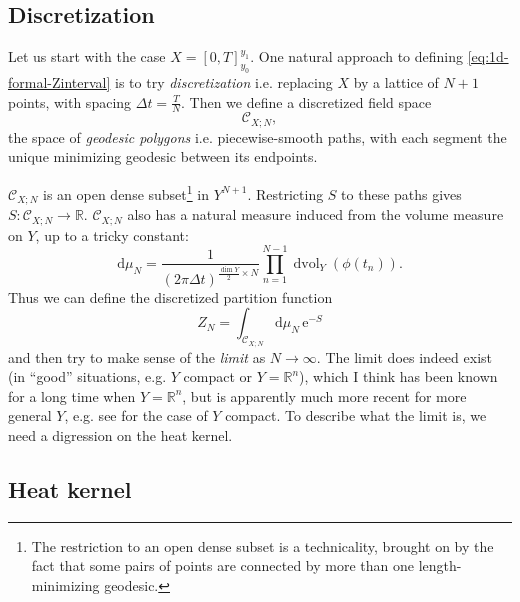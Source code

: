 \documentclass[12pt,letterpaper,reqno]{article}
\numberwithin{equation}{section}
\newcommand{\cC}{\ensuremath{\mathcal C}}
\newcommand{\cO}{\ensuremath{\mathcal O}}
\newcommand{\R}{\ensuremath{\mathbb R}}
\newcommand{\e}{{\mathrm e}}
\newcommand{\de}{\mathrm{d}}
\newcommand{\IP}[1]{\langle#1\rangle}
\newcommand{\ti}[1]{\textit{#1}}
\DeclareMathOperator{\dvol}{dvol}
\newcommand{\insfig}[2]{

\medskip
\noindent
\begin{minipage}{\linewidth}
\makebox[\linewidth]{\texttt{[image: figures/\#1-crop.pdf]}}
\end{minipage}
\noindent}
\begin{document}
\subsection{Discretization} \label{sec:discretization}

Let us start with the case $X = [0,T]_{y_0}^{y_1}$.
One natural approach to defining 
\eqref{eq:1d-formal-Zinterval} 
is to try \ti{discretization} i.e. replacing $X$ by a lattice
of $N+1$ points, with spacing $\Delta t = \frac{T}{N}$. Then we 
define a discretized field space
\begin{equation}
  \cC_{X;N},
\end{equation}
the space of \ti{geodesic polygons} i.e. piecewise-smooth
paths, with each segment the unique minimizing geodesic between its endpoints.
\insfig{qft-geometry-17}{0.8}
$\cC_{X;N}$ is an open dense subset\footnote{The restriction to an open dense
subset is a technicality, brought on by the fact that some pairs of points are
connected by more than one length-minimizing 
geodesic.} in $Y^{N+1}$.
Restricting $S$ to these paths gives $S: \cC_{X;N} \to \R$.
$\cC_{X;N}$ also has a natural measure induced from the volume
measure on $Y$, up to a tricky constant:
\begin{equation} \label{eq:discretized-1d-measures}
 \de\mu_N = \frac{1}{(2 \pi \Delta t)^{\frac{\dim Y}{2} \times N}} \prod_{n=1}^{N-1} \dvol_Y(\phi(t_n)).
\end{equation}
Thus we can define the discretized partition function
\begin{equation}
  Z_N = \int_{\cC_{X;N}} \de \mu_N \, \e^{-S}
\end{equation}
and then try to make sense of the \ti{limit} as $N \to \infty$.
The limit does indeed exist (in ``good'' situations, e.g.
$Y$ compact or $Y = \R^n$), which I think has been known for a 
long time when $Y = \R^n$, but is apparently much more recent
for more general 
$Y$, e.g. see \cite{MR1698956,Baer2007} for the 
case of $Y$ compact.
To describe what the limit is, we need a digression on the heat kernel.


\subsection{Heat kernel}
\end{document}
